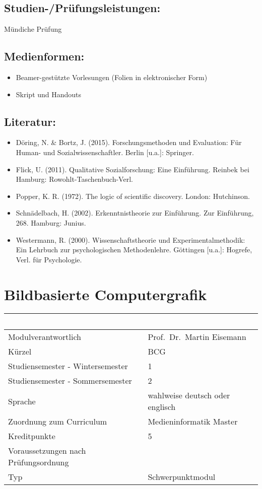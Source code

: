 \section*{Studien-/Prüfungsleistungen:}\label{studien-pruxfcfungsleistungen-20}

Mündiche Prüfung

\section*{Medienformen:}\label{medienformen-20}

\begin{itemize}
\item
  Beamer-gestützte Vorlesungen (Folien in elektronischer Form)
\item
  Skript und Handouts
\end{itemize}

\section*{Literatur:}\label{literatur-17}

\begin{itemize}
\item
  Döring, N. \& Bortz, J. (2015). Forschungsmethoden und Evaluation: Für
  Human- und Sozialwissenschaftler. Berlin {[}u.a.{]}: Springer.
\item
  Flick, U. (2011). Qualitative Sozialforschung: Eine Einführung.
  Reinbek bei Hamburg: Rowohlt-Taschenbuch-Verl.
\item
  Popper, K. R. (1972). The logic of scientific discovery. London:
  Hutchinson.
\item
  Schnädelbach, H. (2002). Erkenntnistheorie zur Einführung. Zur
  Einführung, 268. Hamburg: Junius.
\item
  Westermann, R. (2000). Wissenschaftstheorie und Experimentalmethodik:
  Ein Lehrbuch zur psychologischen Methodenlehre. Göttingen {[}u.a.{]}:
  Hogrefe, Verl. für Psychologie.
\end{itemize}

\chapter{Bildbasierte Computergrafik}\label{bildbasierte-computergrafik}

\begin{longtable}[]{@{}ll@{}}
\toprule
~ & ~\tabularnewline
\midrule
\endhead
Modulverantwortlich & Prof.~Dr.~Martin Eisemann\tabularnewline
Kürzel & BCG\tabularnewline
Studiensemester - Wintersemester & 1\tabularnewline
Studiensemester - Sommersemester & 2\tabularnewline
Sprache & wahlweise deutsch oder englisch\tabularnewline
Zuordnung zum Curriculum & Medieninformatik Master\tabularnewline
Kreditpunkte & 5\tabularnewline
Voraussetzungen nach Prüfungsordnung & ~\tabularnewline
Typ & Schwerpunktmodul\tabularnewline
\bottomrule
\end{longtable}

